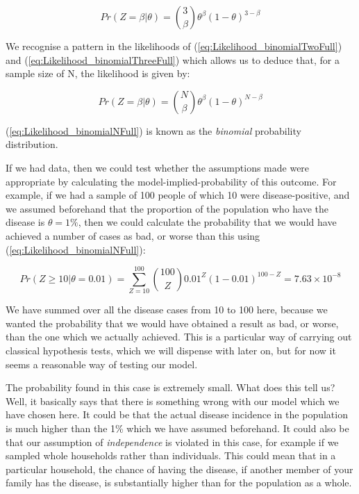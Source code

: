 \documentclass[11pt,fullpage]{book}
\begin{document}
\begin{equation}\label{eq:Likelihood_binomialThreeFull}
Pr(Z=\beta|\theta) = {3 \choose \beta} \theta^\beta (1-\theta)^{3-\beta}
\end{equation}

We recognise a pattern in the likelihoods of (\ref{eq:Likelihood_binomialTwoFull}) and (\ref{eq:Likelihood_binomialThreeFull}) which allows us to deduce that, for a sample size of N, the likelihood is given by:

\begin{equation}\label{eq:Likelihood_binomialNFull}
Pr(Z=\beta|\theta) = {N \choose \beta} \theta^\beta (1-\theta)^{N-\beta}
\end{equation}

(\ref{eq:Likelihood_binomialNFull}) is known as the \textit{binomial} probability distribution.

If we had data, then we could test whether the assumptions made were appropriate by calculating the model-implied-probability of this outcome. For example, if we had a sample of 100 people of which 10 were disease-positive, and we assumed beforehand that the proportion of the population who have the disease is $\theta=1\%$, then we could calculate the probability that we would have achieved a number of cases as bad, or worse than this using (\ref{eq:Likelihood_binomialNFull}):

\begin{equation}
Pr(Z\geq 10|\theta=0.01) = \sum\limits_{Z=10}^{100}{100 \choose Z} 0.01^Z (1-0.01)^{100-Z} = 7.63 \times 10^{-8}
\end{equation}\label{eq:Likelihood_binomialTest}

We have summed over all the disease cases from 10 to 100 here, because we wanted the probability that we would have obtained a result as bad, or worse, than the one which we actually achieved. This is a particular way of carrying out classical hypothesis tests, which we will dispense with later on, but for now it seems a reasonable way of testing our model. 

The probability found in this case is extremely small. What does this tell us? Well, it basically says that there is something wrong with our model which we have chosen here. It could be that the actual disease incidence in the population is much higher than the 1\% which we have assumed beforehand. It could also be that our assumption of  \textit{independence} is violated in this case, for example if we sampled whole households rather than individuals. This could mean that in a particular household, the chance of having the disease, if another member of your family has the disease, is substantially higher than for the population as a whole. 
\end{document}
